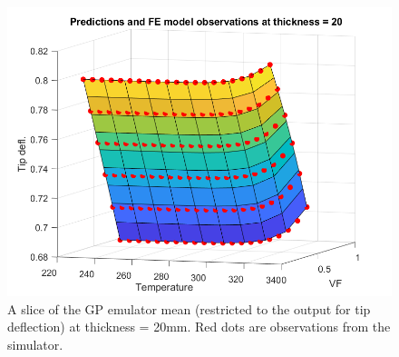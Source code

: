 \documentclass{article}
\begin{document}
%
%
%

%
%

\begin{figure}
\centering
\includegraphics[width=.65\linewidth]{emulator_surface}
\captionsetup{width=.65\linewidth}
\caption{A slice of the GP emulator mean (restricted to the output for tip deflection) at thickness = 20mm. Red dots are observations from the simulator.}
\label{fig:emulator_surface}
\end{figure}
\end{document}
